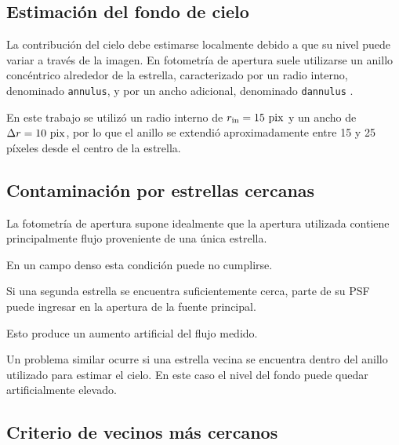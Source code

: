 \documentclass[12pt,letterpaper,oneside]{book}
\begin{document}

\subsection{Estimación del fondo de cielo}

La contribución del cielo debe estimarse localmente debido a que su nivel puede variar a través de la imagen. En fotometría de apertura suele utilizarse un anillo concéntrico alrededor de la estrella, caracterizado por un radio interno, denominado \texttt{annulus}, y por un ancho adicional, denominado \texttt{dannulus} \citep{davis1989,irafapphot2026}.

En este trabajo se utilizó un radio interno de $r_{\rm in}=15\ {\rm pix}$ y un ancho de $\Delta r=10\ {\rm pix}$, por lo que el anillo se extendió aproximadamente entre 15 y 25 píxeles desde el centro de la estrella.



\subsection{Contaminación por estrellas cercanas}

La fotometría de apertura supone idealmente que la apertura utilizada contiene principalmente flujo proveniente de una única estrella.

En un campo denso esta condición puede no cumplirse.

Si una segunda estrella se encuentra suficientemente cerca, parte de su PSF puede ingresar en la apertura de la fuente principal.

Esto produce un aumento artificial del flujo medido.

Un problema similar ocurre si una estrella vecina se encuentra dentro del anillo utilizado para estimar el cielo. En este caso el nivel del fondo puede quedar artificialmente elevado.



\subsection{Criterio de vecinos más cercanos}
\end{document}
